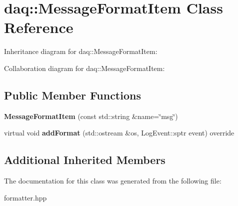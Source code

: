 \hypertarget{classdaq_1_1MessageFormatItem}{}\section{daq\+:\+:Message\+Format\+Item Class Reference}
\label{classdaq_1_1MessageFormatItem}


Inheritance diagram for daq\+:\+:Message\+Format\+Item\+:


Collaboration diagram for daq\+:\+:Message\+Format\+Item\+:
\subsection*{Public Member Functions}
\begin{DoxyCompactItemize}
\item 
\mbox{\label{classdaq_1_1MessageFormatItem_a52db60befd5ab4c0eb852593acbd0ba8}} 
{\bfseries Message\+Format\+Item} (const std\+::string \&name=\char`\"{}msg\char`\"{})
\item 
\mbox{\label{classdaq_1_1MessageFormatItem_a1913e0301997e5d8b6b69d4f26983ed6}} 
virtual void {\bfseries add\+Format} (std\+::ostream \&os, Log\+Event\+::sptr event) override
\end{DoxyCompactItemize}
\subsection*{Additional Inherited Members}


The documentation for this class was generated from the following file\+:\begin{DoxyCompactItemize}
\item 
formatter.\+hpp\end{DoxyCompactItemize}
